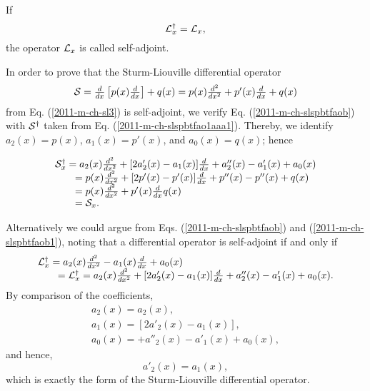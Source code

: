 If
\begin{equation}
{\cal L}_x^\dagger
=  {\cal L}_x ,
\label{2011-m-ch-slspbtfaob1}
\end{equation}
the operator ${\cal L}_x$ is called self-adjoint.

{\color{OliveGreen}
\bproof

In order to prove that the  Sturm-Liouville differential operator
\begin{equation}
\begin{array}  {l}
{\cal S}
=       \frac{d}{dx}
\left[
p(x)
\frac{d}{dx}
\right]
+
q(x)
= p(x) \frac{d^2}{dx^2}
+p'(x) \frac{d}{dx}
+q(x)
\end{array}
\label{2011-m-ch-slspbtfaoc}
\end{equation}
from Eq. (\ref{2011-m-ch-sl3})
is self-adjoint, we verify
Eq. (\ref{2011-m-ch-slspbtfaob})
with
${\cal S}^\dagger$
taken from
Eq. (\ref{2011-m-ch-slspbtfao1aaa1}).
Thereby, we identify
$a_2(x) = p(x)$,
$a_1(x) = p'(x)$,
and
$a_0(x) = q(x)$; hence

\begin{equation}
\begin{array}  {l}
{\cal S}_x^\dagger
=a_2(x) \frac{d^2}{dx^2}
+
[2 a'_2(x)- a_1(x) ]  \frac{d}{dx}
+ a''_2(x)   - a'_1(x)   + a_0(x) \\
\qquad =
p(x)  \frac{d^2}{dx^2}
+ [2 p'(x)-p'(x)] \frac{d}{dx}
+p''(x)-p''(x)+q(x) \\
\qquad =
p(x)  \frac{d^2}{dx^2}
+ p'(x) \frac{d}{dx}
q(x)\\
\qquad = {\cal S}_x
.
\end{array}
\end{equation}

Alternatively we could argue from Eqs. (\ref{2011-m-ch-slspbtfaob}) and (\ref{2011-m-ch-slspbtfaob1}),
noting that
a differential operator is self-adjoint if and only if
\begin{equation} \begin{array}  {l}
 {\cal L}_x^\dagger
=a_2(x) \frac{d^2}{dx^2}   -  a_1(x)\frac{d }{dx }    + a_0(x) \\
\qquad  =   {\cal L}_x^\dagger =
 a_2(x) \frac{d^2}{dx^2}
+
[2 a'_2(x)- a_1(x) ]  \frac{d}{dx}
+ a''_2(x)   - a'_1(x)   + a_0(x)
.
\end{array}\end{equation}
By comparison of the coefficients,
\begin{equation}
\begin{array}  {l}
a_2(x)=a_2(x),\\
a_1(x) =
[2 a'_2(x)- a_1(x) ]  ,\\
a_0(x) =
+ a''_2(x)   - a'_1(x)   + a_0(x)
,
\end{array}
\end{equation}
and hence,
\begin{equation}
 a'_2(x)= a_1(x),
\end{equation}
which is exactly the form of the   Sturm-Liouville differential operator.

\eproof
}


